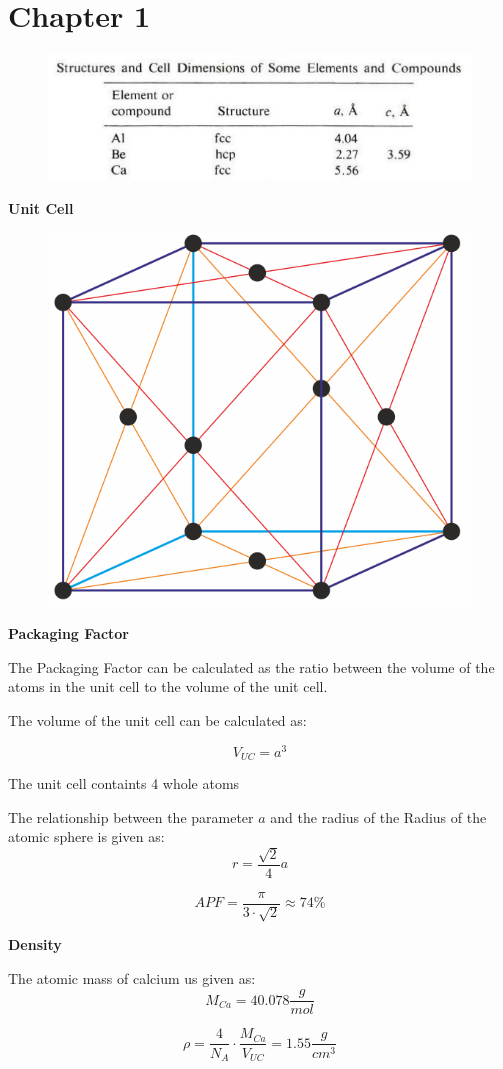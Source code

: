 \section{Chapter 1}

\begin{figure}[H]
	\centering
	\includegraphics[width=0.7\linewidth]{Graphics/Chapter1/StructuresAndCellDimension_Table1_2_Omar}
	\caption{}
	\label{}
\end{figure}


\textbf{Unit Cell}
\begin{figure}[H]
	\centering
	\includegraphics[width=0.4\linewidth]{Graphics/Chapter1/face-centered_cubic_lattice.png}
	\caption{}
	\label{}
\end{figure}

\textbf{Packaging Factor}

The Packaging Factor can be calculated as the ratio between the
volume of the atoms in the unit cell to the volume of the unit cell.

The volume of the unit cell can be calculated as:

$$V_{UC} = a^3$$

The unit cell containts 4 whole atoms 

The relationship between the parameter $a$ and the radius of the Radius of the atomic sphere is given as:
$$r = \frac{\sqrt{2}}{4} a $$

$$APF = \frac{\pi}{3 \cdot \sqrt{2}} \approx 74\%$$


\textbf{Density}

The atomic mass of calcium us given as:
$$M_{Ca} = 40.078 \frac{g}{mol}$$

$$\rho = \frac{4}{N_A} \cdot \frac{M_{Ca}}{V_{UC}} = 1.55 \frac{g}{cm^3}$$